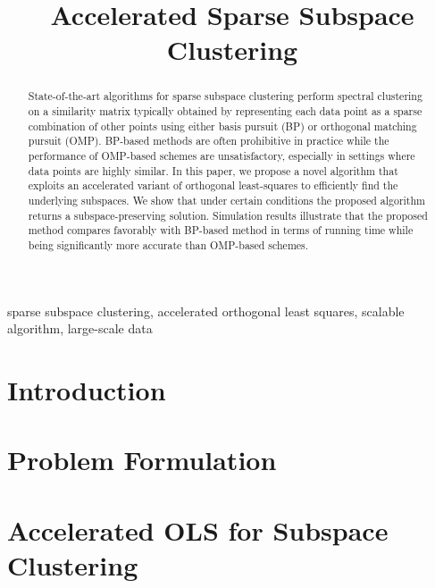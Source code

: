 \documentclass{article}
\title{Accelerated Sparse Subspace Clustering}
\begin{document}
%
\maketitle
%
\begin{abstract}
State-of-the-art algorithms for sparse subspace clustering perform spectral clustering on a similarity matrix typically obtained by representing each data point as a sparse combination of other points using either basis pursuit (BP) or orthogonal matching pursuit (OMP). BP-based methods are often prohibitive in practice while the performance of OMP-based schemes are unsatisfactory, especially in settings where data points are highly similar. In this paper, we propose a novel algorithm that exploits an accelerated variant of orthogonal least-squares to efficiently find the underlying subspaces. We show that under certain conditions the proposed algorithm returns a subspace-preserving solution. Simulation results illustrate that the proposed method compares favorably with BP-based method in terms of running time while being significantly more accurate than OMP-based schemes. 
\end{abstract}
%
\begin{keywords}
sparse subspace clustering, accelerated orthogonal least squares, scalable algorithm, large-scale data
\end{keywords}
\vspace{-0.2cm}
\section{Introduction}\label{sec:intro}

\vspace{-0.2cm}
\section{Problem Formulation}\label{sec:pre}

\vspace{-0.2cm}
\section{Accelerated OLS for Subspace Clustering}\label{sec:alg}

\vspace{-0.2cm}
\end{document}
